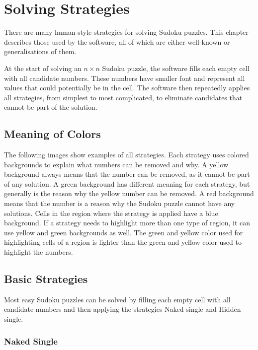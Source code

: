 \chapter{Solving Strategies}\label{ch:chap-2}

There are many human-style strategies for solving Sudoku puzzles.
This chapter describes those used by the software, all of which are either well-known or generalisations of them.

At the start of solving an $n \times n$ Sudoku puzzle, the software fills each empty cell with all candidate numbers.
These numbers have smaller font and represent all values that could potentially be in the cell.
The software then repeatedly applies all strategies, from simplest to most complicated,
to eliminate candidates that cannot be part of the solution.

\section{Meaning of Colors}\label{sec:color}

The following images show examples of all strategies.
Each strategy uses colored backgrounds to explain what numbers can be removed and why.
A yellow background always means that the number can be removed, as it cannot be part of any solution.
A green background has different meaning for each strategy,
but generally is the reason why the yellow number can be removed.
A red background means that the number is a reason why the Sudoku puzzle cannot have any solutions.
Cells in the region where the strategy is applied have a blue background.
If a strategy needs to highlight more than one type of region, it can use yellow and green backgrounds as well.
The green and yellow color used for highlighting cells of a region
is lighter than the green and yellow color used to highlight the numbers.

\section{Basic Strategies}\label{sec:basic-strategies}

Most easy Sudoku puzzles can be solved by filling each empty cell with all candidate numbers
and then applying the strategies Naked single and Hidden single.

\subsection*{Naked Single}

